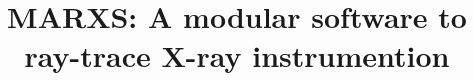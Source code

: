\documentclass[twocolumn]{aastex61}
\begin{document}
\title{MARXS: A modular software to ray-trace X-ray instrumention}




\end{document}
